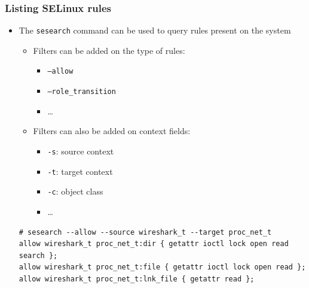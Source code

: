 \begin{frame}[fragile]
	\frametitle{Listing SELinux rules}
	\begin{itemize}
		\item The \texttt{sesearch} command can be used to query rules present on
			the system
			\begin{itemize}
				\item Filters can be added on the type of rules:
					\begin{itemize}
						\item \texttt{--allow}
						\item \texttt{--role\_transition}
						\item \ldots
					\end{itemize}
				\item Filters can also be added on context fields:
					\begin{itemize}
						\item \texttt{-s}: source context
						\item \texttt{-t}: target context
						\item \texttt{-c}: object class
						\item \ldots
					\end{itemize}
			\end{itemize}
			\begin{block}{}
				{\tiny
				\begin{verbatim}
# sesearch --allow --source wireshark_t --target proc_net_t
allow wireshark_t proc_net_t:dir { getattr ioctl lock open read search };
allow wireshark_t proc_net_t:file { getattr ioctl lock open read };
allow wireshark_t proc_net_t:lnk_file { getattr read };
\end{verbatim}
}
			\end{block}
	\end{itemize}
\end{frame}

